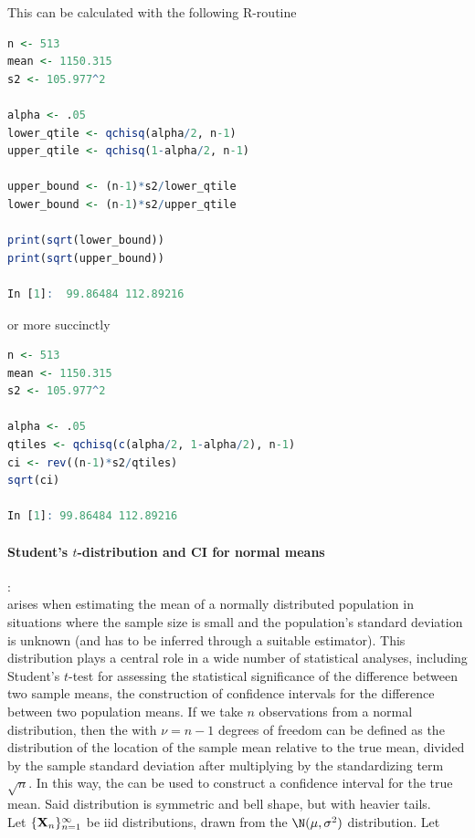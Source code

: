 \documentclass{homework}
\begin{document}
This can be calculated with the following R-routine

\begin{lstlisting}[language=R]
n <- 513
mean <- 1150.315
s2 <- 105.977^2 

alpha <- .05 
lower_qtile <- qchisq(alpha/2, n-1)
upper_qtile <- qchisq(1-alpha/2, n-1)

upper_bound <- (n-1)*s2/lower_qtile
lower_bound <- (n-1)*s2/upper_qtile

print(sqrt(lower_bound))
print(sqrt(upper_bound))

In [1]:  99.86484 112.89216
\end{lstlisting}

or more succinctly

\begin{lstlisting}[language=R]
n <- 513
mean <- 1150.315
s2 <- 105.977^2 

alpha <- .05 
qtiles <- qchisq(c(alpha/2, 1-alpha/2), n-1)
ci <- rev((n-1)*s2/qtiles)
sqrt(ci)

In [1]: 99.86484 112.89216
\end{lstlisting}

\paragraph{\textbf{Student's $t$-distribution and CI for normal means}}: \\

\tdis arises when estimating the mean of a normally distributed population in situations where the sample size is small and the population's standard deviation is unknown (and has to be inferred through a suitable estimator). This distribution plays a central role in a wide number of statistical analyses, including Student's $t$-test for assessing the statistical significance of the difference between two sample means, the construction of confidence intervals for the difference between two population means. 
If we take $n$ observations from a normal distribution, then the \tdis with $\nu = n-1$ degrees of freedom can be defined as the distribution of the location of the sample mean relative to the true mean, divided by the sample standard deviation after multiplying by the standardizing term $\sqrt{n}$. In this way, the \tdis can be used to construct a confidence interval for the true mean. Said distribution is symmetric and bell shape, but with heavier tails. \\

Let $\{{\bf X}_n\}_{n=1}^{\infty}$ be iid distributions, drawn from the $\N(\mu,\sigma^2)$ distribution. Let 
\end{document}
